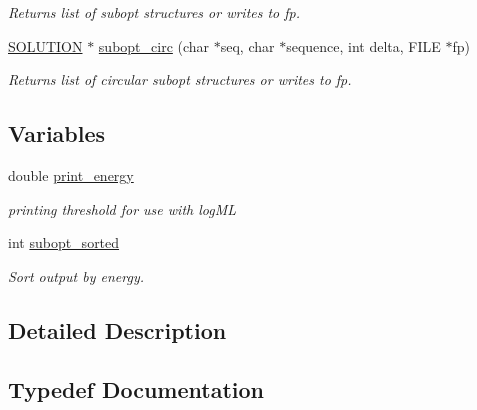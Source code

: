 \begin{DoxyCompactItemize}
\begin{DoxyCompactList}\small\item\em Returns list of subopt structures or writes to fp. \end{DoxyCompactList}\item 
\hyperlink{subopt_8h_aa0f46ff02e1017469cf902d02ecd7f9a}{S\+O\+L\+U\+T\+I\+ON} $\ast$ \hyperlink{group__subopt__wuchty_ga8634516e4740e0b6c9a46d2bae940340}{subopt\+\_\+circ} (char $\ast$seq, char $\ast$sequence, int delta, F\+I\+LE $\ast$fp)
\begin{DoxyCompactList}\small\item\em Returns list of circular subopt structures or writes to fp. \end{DoxyCompactList}\end{DoxyCompactItemize}
\subsection*{Variables}
\begin{DoxyCompactItemize}
\item 
\mbox{\label{group__subopt__wuchty_ga5e57d914bcb5feeecdf520e25313fcfe}} 
double \hyperlink{group__subopt__wuchty_ga5e57d914bcb5feeecdf520e25313fcfe}{print\+\_\+energy}
\begin{DoxyCompactList}\small\item\em printing threshold for use with log\+ML \end{DoxyCompactList}\item 
\mbox{\label{group__subopt__wuchty_ga873cf8ed69e0437f8efa8b1fec854a0e}} 
int \hyperlink{group__subopt__wuchty_ga873cf8ed69e0437f8efa8b1fec854a0e}{subopt\+\_\+sorted}
\begin{DoxyCompactList}\small\item\em Sort output by energy. \end{DoxyCompactList}\end{DoxyCompactItemize}


\subsection{Detailed Description}


\subsection{Typedef Documentation}
\mbox{\label{group__subopt__wuchty_gaa0270c66d04f59e750401695b8282e04}} 
